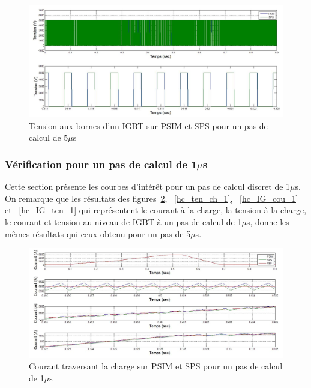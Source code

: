 \documentclass[11pt,letterpaper,final]{report}
\begin{document}
\begin{figure}[htb]
\centering
\includegraphics[scale=0.5]{Fig/Hacheur4Quadrants/HacheurTensionIGBT5u.jpg}
\caption{Tension aux bornes d'un IGBT sur PSIM et SPS pour un pas de calcul de 5$\mu$s}
\label{hc_IG_ten_5}
\end{figure}

\clearpage
\subsubsection{Vérification pour un pas de calcul de 1$\mu$s}
Cette section présente les courbes d'intérêt pour un pas de calcul discret de 1$\mu$s. On remarque que les résultats des figures~\ref{hc_cou_ch_1}, ~\ref{hc_ten_ch_1}, ~\ref{hc_IG_cou_1} et ~\ref{hc_IG_ten_1} qui représentent le courant à la charge, la tension à la charge, le courant et tension au niveau de IGBT à un pas de calcul de 1$\mu$s, donne les mêmes résultats qui ceux obtenu pour un pas de 5$\mu$s. 


\begin{figure}[htb]
\centering
\includegraphics[scale=0.5]{Fig/Hacheur4Quadrants/HacheurCourantCharge1u.jpg}
\caption{Courant traversant la charge sur PSIM et SPS pour un pas de calcul de 1$\mu$s}
\label{hc_cou_ch_1}
\end{figure}
\end{document}
